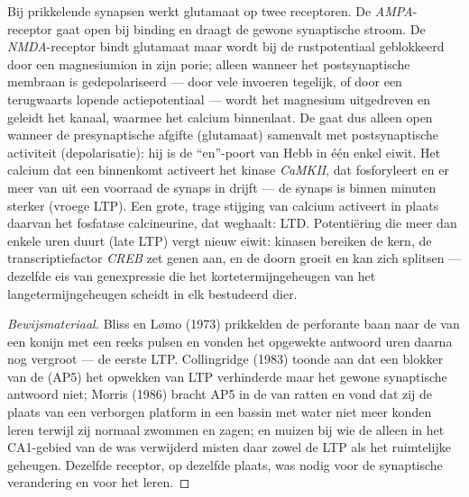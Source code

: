 \begin{proposition}\label{prop:b3:learning-memory:nmda}
Bij prikkelende synapsen werkt glutamaat op twee receptoren. De
\emph{AMPA}-receptor gaat open bij binding en draagt de gewone
synaptische stroom. De \emph{NMDA}-receptor bindt glutamaat maar wordt
bij de rustpotentiaal geblokkeerd door een magnesiumion in zijn porie;
alleen wanneer het postsynaptische membraan is gedepolariseerd --- door
vele invoeren tegelijk, of door een terugwaarts lopende
actiepotentiaal --- wordt het magnesium uitgedreven en geleidt het
kanaal, waarmee het calcium binnenlaat. De  gaat dus
alleen open wanneer de presynaptische afgifte (glutamaat) samenvalt met
postsynaptische activiteit (depolarisatie): hij is de ``en''-poort van
Hebb in één enkel eiwit. Het calcium dat een \emph{}
binnenkomt activeert het kinase \emph{CaMKII}, dat 
fosforyleert en er meer van uit een voorraad de synaps in drijft --- de
synaps is binnen minuten sterker (vroege LTP). Een grote, trage
stijging van calcium activeert in plaats daarvan het fosfatase
calcineurine, dat  weghaalt: LTD. Potentiëring die meer
dan enkele uren duurt (late LTP) vergt nieuw eiwit: kinasen bereiken de
kern, de transcriptiefactor \emph{CREB} zet genen aan, en de doorn
groeit en kan zich splitsen --- dezelfde eis van genexpressie die het
kortetermijngeheugen van het langetermijngeheugen scheidt in elk
bestudeerd dier.
\end{proposition}

\begin{proof}[Bewijsmateriaal]
Bliss en L\o mo (1973) prikkelden de perforante baan naar de
 van een konijn met een reeks pulsen en vonden het opgewekte
antwoord uren daarna nog vergroot --- de eerste LTP. Collingridge
(1983) toonde aan dat een blokker van de  (AP5) het
opwekken van LTP verhinderde maar het gewone synaptische antwoord niet;
Morris (1986) bracht AP5 in de  van ratten en vond dat zij
de plaats van een verborgen platform in een bassin met water niet meer
konden leren terwijl zij normaal zwommen en zagen; en muizen bij wie de
 alleen in het CA1-gebied van de  was
verwijderd misten daar zowel de LTP als het ruimtelijke geheugen.
Dezelfde receptor, op dezelfde plaats, was nodig voor de synaptische
verandering en voor het leren.
\end{proof}

